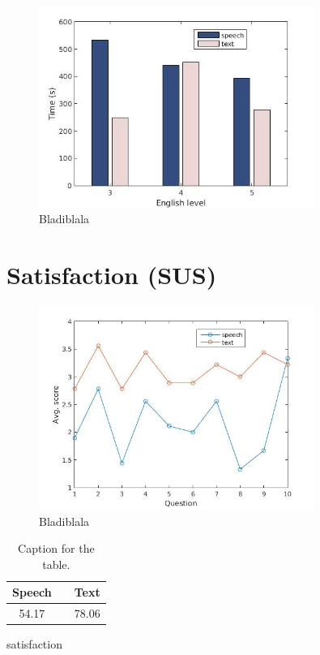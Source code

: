 \begin{figure}[p]
  \centering
  \includegraphics[width=0.8\textwidth]{images/english_time.jpg}
  \caption{Bladiblala}\label{eng_time}
\end{figure}


\section{Satisfaction (SUS)}

\begin{figure}[p]
  \centering
  \includegraphics[width=0.8\textwidth]{images/sus.jpg}
  \caption{Bladiblala}\label{sus_table}
\end{figure}

\begin{table}[h!]
  \centering
  \begin{tabular}{ccc}
    \toprule
    Speech &   & Text\\
    \midrule
    54.17 &   & 78.06\\
    \bottomrule
  \end{tabular}
  \caption{Caption for the table.}\label{tot_score}
\end{table}

satisfaction